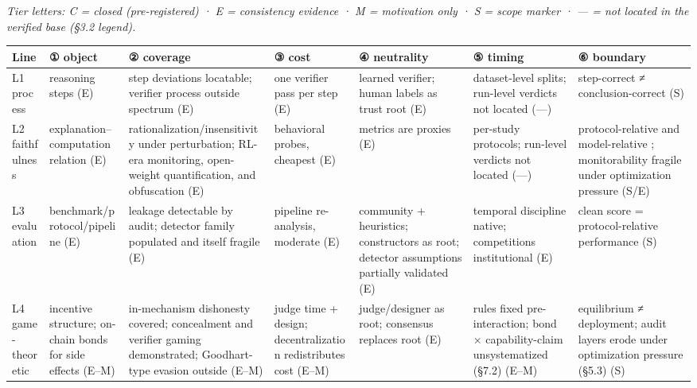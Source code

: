 \documentclass[11pt,a4paper]{article}
\begin{document}
\textit{Tier letters: C = closed (pre-registered) · E = consistency evidence · M = motivation only · S = scope marker · — = not located in the verified base (§3.2 legend).}

\begin{table}[htbp]
\centering
\scriptsize
\setlength{\tabcolsep}{2.5pt}
\renewcommand{\arraystretch}{1.18}
\begin{tabularx}{0.985\textwidth}{>{\raggedright\arraybackslash}p{} *{6}{>{\raggedright\arraybackslash}p{}}}
\toprule
\textbf{Line} & \textbf{① object} & \textbf{② coverage} & \textbf{③ cost} & \textbf{④ neutrality} & \textbf{⑤ timing} & \textbf{⑥ boundary} \\
\midrule
L1 process \cite{key05,key06} & reasoning steps (E) & step deviations locatable; verifier process outside spectrum (E) & one verifier pass per step (E) & learned verifier; human labels as trust root (E) & dataset-level splits; run-level verdicts not located (—) & step-correct ≠ conclusion-correct (S) \\
L2 faithfulness \cite{key02,key03,key29,key30,key31,key32,key33,key34} & explanation–computation relation (E) & rationaliza\-tion\slash insensitivity under perturbation; RL-era monitoring, open-weight quantification, and obfuscation \cite{key30,key31,key32,key34} (E) & behavioral probes, cheapest (E) & metrics are proxies (E) & per-study protocols; run-level verdicts not located (—) & protocol-relative and model-relative \cite{key32}; monitorability fragile under optimization pressure \cite{key30,key32,key33,key34} (S\slash E) \\
L3 evaluation \cite{key07,key08,key35,key36,key37,key38,key39,key40,key41,key42} & benchmark\slash protocol\slash pipeline (E) & leakage detectable by audit; detector family populated and itself fragile \cite{key36,key37,key38,key39,key40,key41,key42} (E) & pipeline re-analysis, moderate (E) & community + heuristics; constructors as root; detector assumptions partially validated \cite{key39} (E) & temporal discipline native; competitions institutional \cite{key35} (E) & clean score = protocol-relative performance (S) \\
L4 game-theoretic \cite{key09,key10,key43,key44,key45,key46,key47,key48,key49,key50,key51} & incentive structure; on-chain bonds for side effects \cite{key48,key49,key50,key51} (E–M) & in-mechanism dishonesty covered; concealment \cite{key30} and verifier gaming \cite{key47} demonstrated; Goodhart-type evasion outside (E–M) & judge time + design; decentralization redistributes cost \cite{key44,key45,key46} (E–M) & judge\slash designer as root; consensus replaces root \cite{key44,key45,key46} (E) & rules fixed pre-interaction; bond × capability-claim unsystematized (§7.2) (E–M) & equilibrium ≠ deployment; audit layers erode under optimization pressure (§5.3) (S) \\

\end{tabularx}
\end{table}
\end{document}
